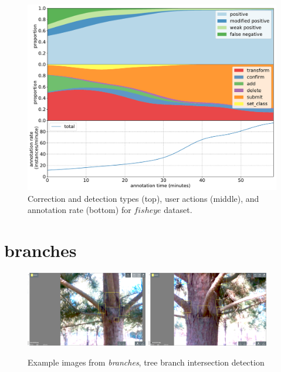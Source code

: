 \begin{figure}[!h]
\centering
\includegraphics[width=1.0\linewidth]{charts/action_annotations/fisheye.pdf}
\caption{Correction and detection types (top), user actions (middle), and annotation rate (bottom) for $fisheye$ dataset.}
\label{fig:fisheye_annotation}
\end{figure}


\pagebreak
\section{branches}
\label{sec:branches_details}


\begin{figure}[!h]
  \includegraphics[width=0.475\textwidth]{figures/annotation/screenshots/branches3.png}
  \includegraphics[width=0.475\textwidth]{figures/annotation/screenshots/branches2.png}  
  
  \caption{Example images from \emph{branches}, tree branch intersection detection}
\end{figure}

